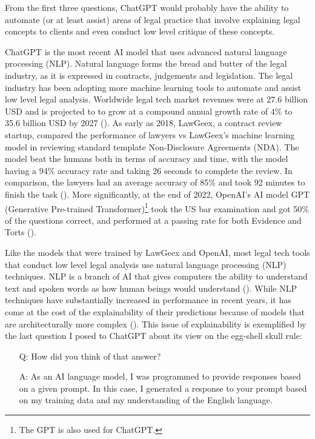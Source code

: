 From the first three questions, ChatGPT would probably have the ability to automate (or at least assist) areas of legal practice that involve explaining legal concepts to clients and even conduct low level critique of these concepts.

ChatGPT is the most recent AI model that uses advanced natural language processing (NLP). Natural language forms the bread and butter of the legal industry, as it is expressed in contracts, judgements and legislation. The legal industry has been adopting more machine learning tools to automate and assist low level legal analysis. Worldwide legal tech market revenues were at 27.6 billion USD and is projected to to grow at a compound annual growth rate of 4\% to 35.6 billion USD by 2027 (\cite{statista}). As early as 2018, LawGeex, a contract review startup, compared the performance of lawyers vs LawGeex's machine learning model in reviewing standard template Non-Disclosure Agreements (NDA). The model beat the humans both in terms of accuracy and time, with the model having a 94\% accuracy rate and taking 26 seconds to complete the review. In comparison, the lawyers had an average accuracy of 85\% and took 92 minutes to finish the task (\cite{lawgeex}). More significantly, at the end of 2022, OpenAI's AI model GPT (Generative Pre-trained Transformer)\footnote{The GPT is also used for ChatGPT.} took the US bar examination and got 50\% of the questions correct, and performed at a passing rate for both Evidence and Torts (\cite{bommarito2022}).

Like the models that were trained by LawGeex and OpenAI, most legal tech tools that conduct low level legal analysis use natural language processing (NLP) techniques. NLP is a branch of AI that gives computers the ability to understand text and spoken words as how human beings would understand (\cite{ibm_nlp}). While NLP techniques have substantially increased in performance in recent years, it has come at the cost of the explainability of their predictions because of models that are architecturally more complex (\cite{zini2022}). This issue of explainability is exemplified by the last question I posed to ChatGPT about its view on the egg-shell skull rule:

\begin{itemize}
  \item[Q:] How did you think of that answer?
  \item[A:] As an AI language model, I was programmed to provide responses based on a given prompt. In this case, I generated a response to your prompt based on my training data and my understanding of the English language.
\end{itemize}

